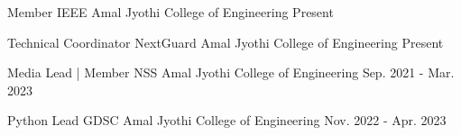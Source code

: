 
\begin{cventries}
  \cventry
    {Member} %
    {IEEE} %
    {Amal Jyothi College of Engineering}
    {Present} %
    {}
\end{cventries}
\vspace{-1\baselineskip}
\begin{cventries}
  \cventry
    {Technical Coordinator} %
    {NextGuard} %
    {Amal Jyothi College of Engineering}
    {Present} %
    {}
\end{cventries}
\vspace{-1\baselineskip}
\begin{cventries}
  \cventry
    {Media Lead | Member} %
    {NSS} %
    {Amal Jyothi College of Engineering}
    {Sep. 2021 - Mar. 2023} %
    {}
\end{cventries}
\vspace{-1\baselineskip}
\begin{cventries}
  \cventry
    {Python Lead} %
    {GDSC} %
    {Amal Jyothi College of Engineering}
    {Nov. 2022 - Apr. 2023} %
    {}
\end{cventries}